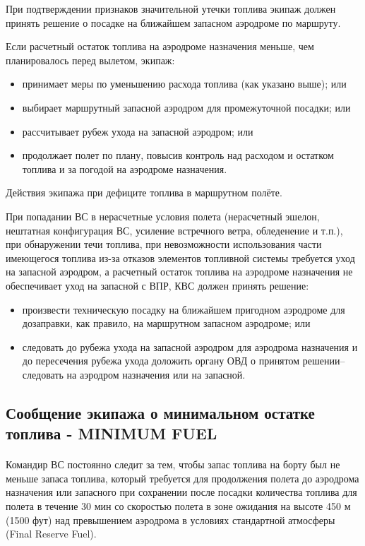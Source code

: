 При подтверждении признаков значительной утечки топлива экипаж должен принять решение о посадке на ближайшем запасном аэродроме по маршруту.

Если расчетный остаток топлива на аэродроме назначения меньше, чем планировалось перед вылетом, экипаж:

\begin{itemize}
    \item принимает меры по уменьшению расхода топлива (как указано выше); или
    \item выбирает маршрутный запасной аэродром для промежуточной посадки; или
    \item рассчитывает рубеж ухода на запасной аэродром; или
    \item продолжает полет по плану, повысив контроль над расходом и остатком топлива и за погодой на аэродроме назначения.
\end{itemize}

Действия экипажа при дефиците топлива в маршрутном полёте.

При попадании ВС в нерасчетные условия полета (нерасчетный эшелон, нештатная конфигурация ВС, усиление встречного ветра, обледенение и т.п.), при обнаружении течи топлива, при невозможности использования части имеющегося топлива из-за отказов элементов топливной системы требуется уход на запасной аэродром, а расчетный остаток топлива на аэродроме назначения не обеспечивает уход на запасной с ВПР, КВС должен принять решение:
\begin{itemize}
    \item произвести техническую посадку на ближайшем пригодном аэродроме для дозаправки, как правило, на маршрутном запасном аэродроме; или
    \item следовать до рубежа ухода на запасной аэродром для аэродрома назначения и до пересечения рубежа ухода доложить органу ОВД о принятом решении–следовать на аэродром назначения или на запасной.
\end{itemize}

\subsection{Сообщение экипажа о минимальном остатке топлива - MINIMUM FUEL}

\paragraph{} Командир ВС постоянно следит за тем, чтобы запас топлива на борту был не меньше запаса топлива, который требуется для продолжения полета до аэродрома назначения или запасного при сохранении после посадки количества топлива для полета в течение 30 мин со скоростью полета в зоне ожидания на высоте 450 м (1500 фут) над превышением аэродрома в условиях стандартной атмосферы (Final Reserve Fuel).

